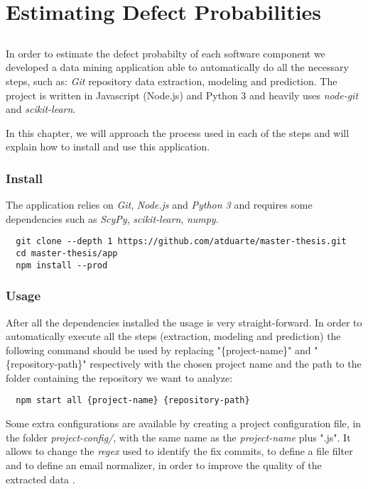 \chapter{Estimating Defect Probabilities} \label{chap:chap3}

\section*{}

In order to estimate the defect probabilty of each software component we developed a data mining application able to automatically do all the necessary steps,
such as: \emph{Git} repository data extraction, modeling and prediction. The project is written in Javascript (Node.js) and Python 3 and heavily uses \emph{node-git}
and \emph{scikit-learn}.

In this chapter, we will approach the process used in each of the steps and will explain how to install and use this application.

\subsection{Install}

The application relies on \emph{Git}, \emph{Node.js} and \emph{Python 3} and requires some dependencies such as \emph{ScyPy}, \emph{scikit-learn}, \emph{numpy}.

\begin{lstlisting}
  git clone --depth 1 https://github.com/atduarte/master-thesis.git
  cd master-thesis/app
  npm install --prod
\end{lstlisting}

\subsection{Usage}

After all the dependencies installed the usage is very straight-forward.
In order to automatically execute all the steps (extraction, modeling and prediction) the following command should be used
by replacing "\{project-name\}" and "\{repository-path\}" respectively with
the chosen project name and the path to the folder containing the repository we want to analyze:

\begin{lstlisting}
  npm start all {project-name} {repository-path}
\end{lstlisting}

Some extra configurations are available by creating a project configuration file, in the folder \emph{project-config/}, with the same name as the \emph{project-name} plus ".js".
It allows to change the \emph{regex} used to identify the fix commits, to define a file filter and to define an email normalizer, in order to improve the quality of the extracted data .

